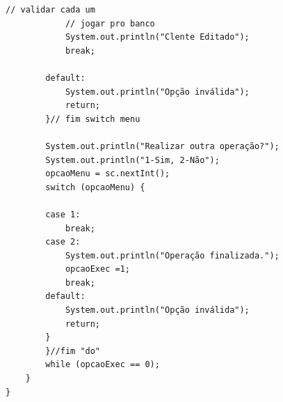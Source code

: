 \begin{lstlisting}[caption={Classe Menu em Java}, label={lst:menu_java}]
			// validar cada um
			// jogar pro banco
			System.out.println("Clente Editado");
			break;

		default:
			System.out.println("Opção inválida");
			return;
		}// fim switch menu

		System.out.println("Realizar outra operação?");
		System.out.println("1-Sim, 2-Não");
		opcaoMenu = sc.nextInt();
		switch (opcaoMenu) {

		case 1:
			break;
		case 2:
			System.out.println("Operação finalizada.");
			opcaoExec =1;
			break;
		default:
			System.out.println("Opção inválida");
			return;
		}
		}//fim "do"
		while (opcaoExec == 0);
	}
}


\end{lstlisting}